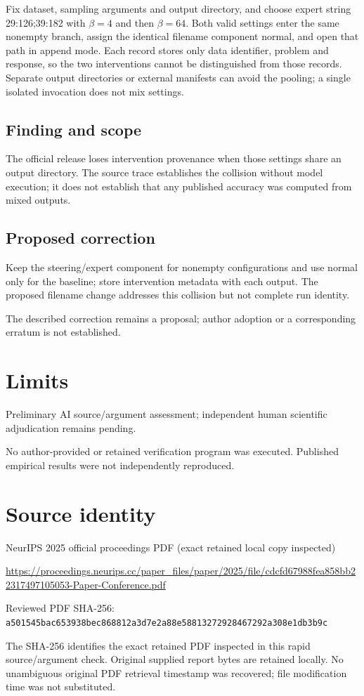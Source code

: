 \documentclass[11pt]{article}
\begin{document}
Fix dataset, sampling arguments and output directory, and choose expert string 29:126;39:182 with \(\beta=4\) and then \(\beta=64\). Both valid settings enter the same nonempty branch, assign the identical filename component normal, and open that path in append mode. Each record stores only data identifier, problem and response, so the two interventions cannot be distinguished from those records. Separate output directories or external manifests can avoid the pooling; a single isolated invocation does not mix settings.

\subsection*{Finding and scope}

The official release loses intervention provenance when those settings share an output directory. The source trace establishes the collision without model execution; it does not establish that any published accuracy was computed from mixed outputs.

\subsection*{Proposed correction}

Keep the steering/expert component for nonempty configurations and use normal only for the baseline; store intervention metadata with each output. The proposed filename change addresses this collision but not complete run identity.

The described correction remains a proposal; author adoption or a corresponding erratum is not established.

\section*{Limits}

Preliminary AI source/argument assessment; independent human scientific adjudication remains pending.\par

No author-provided or retained verification program was executed. Published empirical results were not independently reproduced.\par

\section*{Source identity}

NeurIPS 2025 official proceedings PDF (exact retained local copy inspected)

\url{https://proceedings.neurips.cc/paper_files/paper/2025/file/cdcfd67988fea858bb22317497105053-Paper-Conference.pdf}

Reviewed PDF SHA-256: \nolinkurl{a501545bac653938bec868812a3d7e2a88e58813272928467292a308e1db3b9c}

The SHA-256 identifies the exact retained PDF inspected in this rapid source/argument check. Original supplied report bytes are retained locally. No unambiguous original PDF retrieval timestamp was recovered; file modification time was not substituted.
\end{document}
